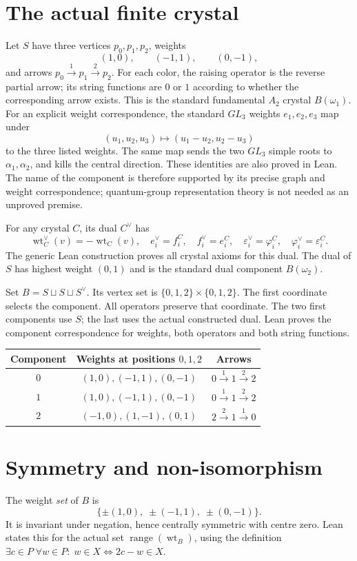 \documentclass[11pt,a4paper]{article}
\newcommand{\wt}{\operatorname{wt}}
\newcommand{\eps}{\varepsilon}
\begin{document}
\section*{The actual finite crystal}
Let $S$ have three vertices $p_0,p_1,p_2$, weights
\[
 (1,0),\qquad (-1,1),\qquad (0,-1),
\]
and arrows $p_0\xrightarrow{1}p_1\xrightarrow{2}p_2$.
For each color, the raising operator is the reverse partial arrow; its string
functions are $0$ or $1$ according to whether the corresponding arrow exists.
This is the standard fundamental $A_2$ crystal $B(\omega_1)$.
For an explicit weight correspondence, the standard $GL_3$ weights $e_1,e_2,e_3$
map under
\[
 (u_1,u_2,u_3)\longmapsto (u_1-u_2,u_2-u_3)
\]
to the three listed weights. The same map sends the two $GL_3$ simple roots
to $\alpha_1,\alpha_2$, and kills the central direction. These identities are
also proved in Lean. The name of the component is therefore supported by its
precise graph and weight correspondence; quantum-group representation theory
is not needed as an unproved premise.

For any crystal $C$, its dual $C^\vee$ has
\[
 \wt^\vee_C(v)=-\wt_C(v),\quad
 e_i^\vee=f_i^C,\quad f_i^\vee=e_i^C,\quad
 \eps_i^\vee=\varphi_i^C,\quad
 \varphi_i^\vee=\eps_i^C.
\]
The generic Lean construction proves all crystal axioms for this dual.
The dual of $S$ has highest weight $(0,1)$ and is the standard dual component
$B(\omega_2)$.

Set $B=S\sqcup S\sqcup S^\vee$. Its vertex set is
$\{0,1,2\}\times\{0,1,2\}$. The first coordinate selects the component.
All operators preserve that coordinate. The two first components use $S$;
the last uses the actual constructed dual. Lean proves the component
correspondence for weights, both operators and both string functions.

\begin{center}
\begin{tabular}{ccc}
\hline
Component & Weights at positions $0,1,2$ & Arrows\\
\hline
$0$ & $(1,0),(-1,1),(0,-1)$ & $0\xrightarrow{1}1\xrightarrow{2}2$\\
$1$ & $(1,0),(-1,1),(0,-1)$ & $0\xrightarrow{1}1\xrightarrow{2}2$\\
$2$ & $(-1,0),(1,-1),(0,1)$ & $2\xrightarrow{2}1\xrightarrow{1}0$\\
\hline
\end{tabular}
\end{center}

\section*{Symmetry and non-isomorphism}
The weight \emph{set} of $B$ is
\[
 \{\pm(1,0),\;\pm(-1,1),\;\pm(0,-1)\}.
\]
It is invariant under negation, hence centrally symmetric with centre zero.
Lean states this for the actual set $\operatorname{range}(\wt_B)$, using the
definition $\exists c\in P\;\forall w\in P:\;w\in X\iff 2c-w\in X$.
\end{document}
